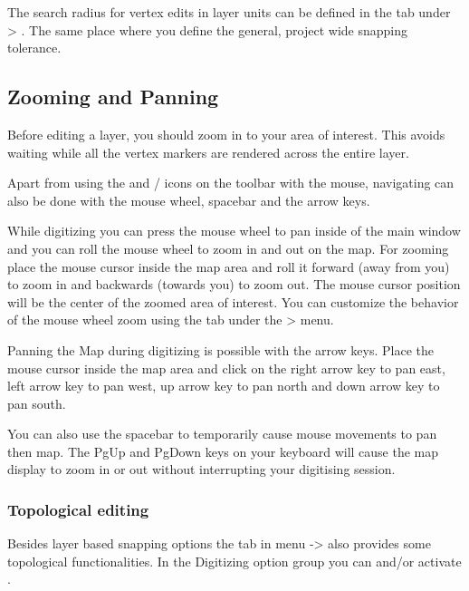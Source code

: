 The search radius for vertex edits in layer units can be defined in the
 tab under  >
. The same place where you define the
general, project wide snapping tolerance.

\subsection{Zooming and Panning}

Before editing a layer, you should zoom in to your area of interest. This
avoids waiting while all the vertex markers are rendered across the entire
layer.

Apart from using the  and
/
icons on the toolbar with the mouse, navigating can also be done with the
mouse wheel, spacebar and the arrow keys.


While digitizing you can press the mouse wheel to pan inside of the main
window and you can roll the mouse wheel to zoom in and out on the map. For
zooming place the mouse cursor inside the map area and roll it forward (away
from you)
to zoom in and backwards (towards you) to zoom out. The mouse cursor position
will
be the center of the zoomed area of interest. You can customize the behavior
of the mouse wheel zoom using the  tab under the
 > menu.


Panning the Map during digitizing is possible with the arrow keys. Place
the mouse cursor inside the map area and click on the right arrow key to
pan east, left arrow key to pan west, up arrow key to pan north and down
arrow key to pan south.

You can also use the spacebar to temporarily cause mouse movements to pan
then map. The PgUp and PgDown keys on your keyboard will cause the map
display to zoom in or out without interrupting your digitising session.

\subsubsection{Topological editing}

Besides layer based snapping options the  tab in menu 
 ->  
also provides some topological functionalities. 
In the Digitizing option group you can  and/or activate 
.

